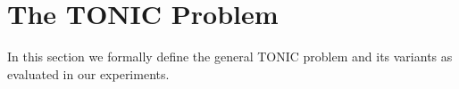 \documentclass[prodmode,acmtecs]{acmsmall} %
\begin{document}

\section{The TONIC Problem}
\label{sec:problem}






In this section we formally define the general TONIC problem and its variants as evaluated in our experiments. %
\end{document}
